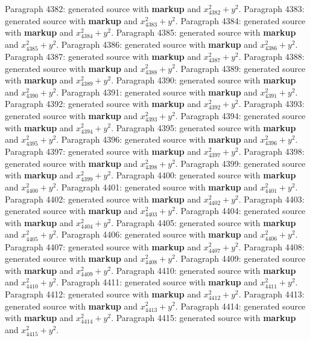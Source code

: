 \documentclass{article}
\begin{document}
Paragraph 4382: generated source with \textbf{markup} and $x_{4382}^2 + y^2$.
Paragraph 4383: generated source with \textbf{markup} and $x_{4383}^2 + y^2$.
Paragraph 4384: generated source with \textbf{markup} and $x_{4384}^2 + y^2$.
Paragraph 4385: generated source with \textbf{markup} and $x_{4385}^2 + y^2$.
Paragraph 4386: generated source with \textbf{markup} and $x_{4386}^2 + y^2$.
Paragraph 4387: generated source with \textbf{markup} and $x_{4387}^2 + y^2$.
Paragraph 4388: generated source with \textbf{markup} and $x_{4388}^2 + y^2$.
Paragraph 4389: generated source with \textbf{markup} and $x_{4389}^2 + y^2$.
Paragraph 4390: generated source with \textbf{markup} and $x_{4390}^2 + y^2$.
Paragraph 4391: generated source with \textbf{markup} and $x_{4391}^2 + y^2$.
Paragraph 4392: generated source with \textbf{markup} and $x_{4392}^2 + y^2$.
Paragraph 4393: generated source with \textbf{markup} and $x_{4393}^2 + y^2$.
Paragraph 4394: generated source with \textbf{markup} and $x_{4394}^2 + y^2$.
Paragraph 4395: generated source with \textbf{markup} and $x_{4395}^2 + y^2$.
Paragraph 4396: generated source with \textbf{markup} and $x_{4396}^2 + y^2$.
Paragraph 4397: generated source with \textbf{markup} and $x_{4397}^2 + y^2$.
Paragraph 4398: generated source with \textbf{markup} and $x_{4398}^2 + y^2$.
Paragraph 4399: generated source with \textbf{markup} and $x_{4399}^2 + y^2$.
Paragraph 4400: generated source with \textbf{markup} and $x_{4400}^2 + y^2$.
Paragraph 4401: generated source with \textbf{markup} and $x_{4401}^2 + y^2$.
Paragraph 4402: generated source with \textbf{markup} and $x_{4402}^2 + y^2$.
Paragraph 4403: generated source with \textbf{markup} and $x_{4403}^2 + y^2$.
Paragraph 4404: generated source with \textbf{markup} and $x_{4404}^2 + y^2$.
Paragraph 4405: generated source with \textbf{markup} and $x_{4405}^2 + y^2$.
Paragraph 4406: generated source with \textbf{markup} and $x_{4406}^2 + y^2$.
Paragraph 4407: generated source with \textbf{markup} and $x_{4407}^2 + y^2$.
Paragraph 4408: generated source with \textbf{markup} and $x_{4408}^2 + y^2$.
Paragraph 4409: generated source with \textbf{markup} and $x_{4409}^2 + y^2$.
Paragraph 4410: generated source with \textbf{markup} and $x_{4410}^2 + y^2$.
Paragraph 4411: generated source with \textbf{markup} and $x_{4411}^2 + y^2$.
Paragraph 4412: generated source with \textbf{markup} and $x_{4412}^2 + y^2$.
Paragraph 4413: generated source with \textbf{markup} and $x_{4413}^2 + y^2$.
Paragraph 4414: generated source with \textbf{markup} and $x_{4414}^2 + y^2$.
Paragraph 4415: generated source with \textbf{markup} and $x_{4415}^2 + y^2$.
\end{document}
